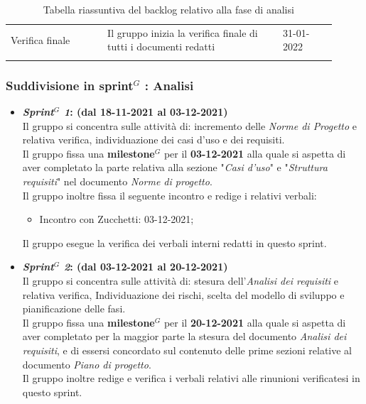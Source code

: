 {\begin{longtable}{p{0.27\linewidth}p{0.49\linewidth}p{0.15\linewidth}}
    \rowcolor[RGB]{233, 245, 206}
    Verifica finale & Il gruppo inizia la verifica finale di tutti i documenti redatti & 31-01-2022\\

    \caption{Tabella riassuntiva del backlog relativo alla fase di analisi}
\end{longtable}
}

\subsubsection{Suddivisione in sprint$^G$ : Analisi}
\begin{itemize}
    \item \textbf{\textit{Sprint$^G$  1}: (dal 18-11-2021 al 03-12-2021)}\\
    Il gruppo si concentra sulle attività di: incremento delle \textit{Norme di Progetto} e relativa verifica, individuazione dei casi d'uso e dei requisiti.\\
    Il gruppo fissa una \textbf{milestone}$^G$  per il \textbf{03-12-2021} alla quale si aspetta di aver completato la parte relativa alla sezione "\textit{Casi d'uso}" e "\textit{Struttura requisiti}" nel documento \textit{Norme di progetto}.\\
    Il gruppo inoltre fissa il seguente incontro e redige i relativi verbali:
    \begin{itemize}
        \item Incontro con Zucchetti: 03-12-2021;
    \end{itemize}
    Il gruppo esegue la verifica dei verbali interni redatti in questo sprint.

    \item \textbf{\textit{Sprint$^G$  2}: (dal 03-12-2021 al 20-12-2021)}\\
    Il gruppo si concentra sulle attività di: stesura dell'\textit{Analisi dei requisiti} e relativa verifica, Individuazione dei rischi, scelta del modello di sviluppo e pianificazione delle fasi.\\
    Il gruppo fissa una \textbf{milestone}$^G$  per il \textbf{20-12-2021} alla quale si aspetta di aver completato per la maggior parte la stesura del documento \textit{Analisi dei requisiti}, e di essersi concordato sul contenuto delle prime sezioni relative al documento \textit{Piano di progetto}.\\
    Il gruppo inoltre redige e verifica i verbali relativi alle rinunioni verificatesi in questo sprint.


\end{itemize}
